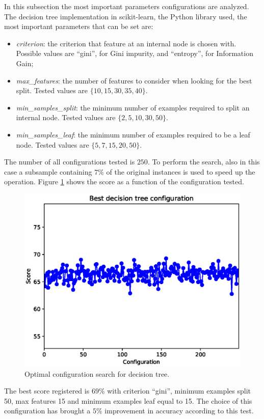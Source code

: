 \documentclass[a4paper, 10pt]{article}
\begin{document}
In this subsection the most important parameters configurations are analyzed. The decision tree implementation in scikit-learn, the Python library used, the most important parameters that can be set are:
\begin{itemize}
 \item \emph{criterion}: the criterion that feature at an internal node is chosen with. Possible values are ``gini'', for Gini impurity, and ``entropy'', for Information Gain;
 \item \emph{max\_features}: the number of features to consider when looking for the best split. Tested values are $\{10, 15, 30, 35, 40\}$.
 \item \emph{min\_samples\_split}: the minimum number of examples required to split an internal node. Tested values are $\{2, 5, 10, 30, 50\}$.
 \item \emph{min\_samples\_leaf}: the minimum number of examples required to be a leaf node. Tested values are $\{5, 7, 15, 20, 50\}$.
\end{itemize}

The number of all configurations tested is $250$. To perform the search, also in this case a subsample containing $7\%$ of the original instances is used to speed up the operation. Figure \ref{fig:dt_config} shows the score as a function of the configuration tested.

\begin{figure}[H]
 \centering
 \includegraphics[width=0.8\linewidth]{pictures/decision_tree_config.eps}
 \caption{Optimal configuration search for decision tree.}
 \label{fig:dt_config}
\end{figure}

The best score registered is $69\%$ with criterion ``gini'', minimum examples split 50, max features 15 and minimum examples leaf equal to 15. The choice of this configuration has brought a $5\%$ improvement in accuracy according to this test. 
 
\end{document}
